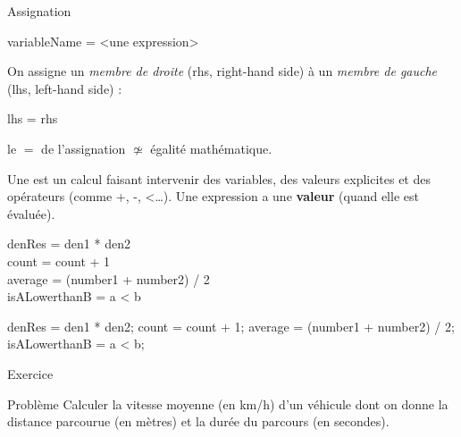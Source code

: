 \begin{hideedit}
\begin{frame}[fragile]{Assignation}
  \begin{java}
variableName = <une expression>
  \end{java}
\end{frame}

\begin{frame}[fragile]
  On assigne un \emph{membre de droite} (rhs, right-hand side) à un
  \emph{membre de gauche} (lhs, left-hand side) :
  \begin{java}
lhs = rhs
  \end{java}

  \pause
  \bcattention le \(=\) de l'assignation \(\not\simeq\) égalité mathématique.
\end{frame}

\begin{frame}[fragile]
  \begin{definition}[Expression]
    Une  est un calcul faisant
    intervenir des variables, des valeurs explicites et des opérateurs
    (comme +, -, <\dots).  Une expression a une \textbf{valeur} (quand elle est
    évaluée).
  \end{definition}

  \pause
  \begin{langagenaturel}
     denRes = den1 * den2\\
     count = count + 1\\
     average = (number1 + number2) / 2\\
     isALowerthanB = a < b 
  \end{langagenaturel}

  \begin{java}
denRes = den1 * den2;
count = count + 1;
average = (number1 + number2) / 2;
isALowerthanB = a < b;
  \end{java}
\end{frame}

\begin{frame}{Exercice}
  \begin{block}{Problème}
    Calculer la vitesse moyenne (en km/h) d’un véhicule dont on donne la
    distance parcourue (en mètres) et la durée du parcours (en secondes).
  \end{block}


\end{frame}
\end{hideedit}
